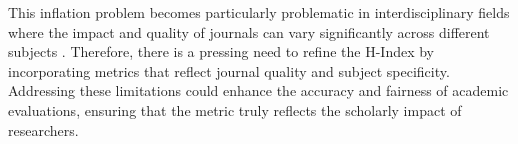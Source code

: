 This inflation problem becomes particularly problematic in interdisciplinary
fields where the impact and quality of journals can vary significantly across
different subjects \cite{hirsch2005index,waltman2012inconsistency}. Therefore,
there is a pressing need to refine the H-Index by incorporating metrics that
reflect journal quality and subject specificity. Addressing these limitations
could enhance the accuracy and fairness of academic evaluations, ensuring that
the metric truly reflects the scholarly impact of researchers.

%
%
